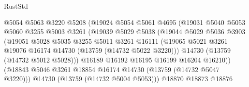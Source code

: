 \begin{lexlean}{RustStd}
\begin{coremodule}
                                @5054
                                @5063
                                @3220
                                @5208
                                (@19024
                                  @5054
                                  @5061
                                  @4695
                                  (@19031
                                    @5040
                                    @5053
                                    @5060
                                    @3255
                                    @5003
                                    @3261
                                    (@19039
                                      @5029
                                      @5038
                                      (@19044
                                        @5029
                                        @5036
                                        @3903
                                        (@19051
                                          @5028
                                          @5035
                                          @3255
                                          @5011
                                          @3261
                                          @16111
                                          (@19065
                                            @5021
                                            @3261
                                            @19076
                                            @16174
                                            @14730
                                            (@13759 (@14732 @5022 @3220)))
                                          @14730
                                          (@13759 (@14732 @5012 @5028)))
                                        @16189
                                        @16192
                                        @16195
                                        @16199
                                        @16204
                                        @16210))
                                    (@18843
                                      @5046
                                      @3261
                                      @18854
                                      @16174
                                      @14730
                                      (@13759 (@14732 @5047 @3220)))
                                    @14730
                                    (@13759 (@14732 @5004 @5053)))
                                  @18870
                                  @18873
                                  @18876

\end{coremodule}
\end{lexlean}
